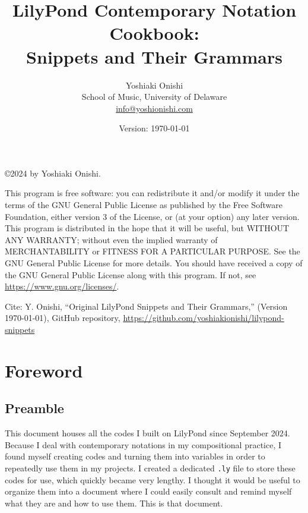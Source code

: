 \documentclass[11pt, oneside]{book}   	%
\title{LilyPond Contemporary Notation Cookbook: \\ Snippets and Their Grammars}
\author{Yoshiaki Onishi\\School of Music, University of Delaware \\ \href{mailto:info@yoshionishi.com}{info@yoshionishi.com}}
\date{Version: \today}
\begin{document}
\maketitle




\copyright 2024 by Yoshiaki Onishi. 
\hfill \break
\break

This program is free software: you can redistribute it and/or modify it under the terms of the GNU General Public License as published by the Free Software Foundation, either version 3 of the License, or (at your option) any later version.
\hfill \break
\break
This program is distributed in the hope that it will be useful, but WITHOUT ANY WARRANTY; without even the implied warranty of MERCHANTABILITY or FITNESS FOR A PARTICULAR PURPOSE. See the GNU General Public License for more details.
\hfill \break
\break
You should have received a copy of the GNU General Public License along with this program. If not, see  \href{https://www.gnu.org/licenses/}{https://www.gnu.org/licenses/}.

\hfill \break
\break
Cite: Y. Onishi, “Original LilyPond Snippets and Their Grammars,” (Version \today), GitHub repository, \href{https://github.com/yoshiakionishi/lilypond-snippets}{https://github.com/yoshiakionishi/lilypond-snippets}\\ %


\frontmatter
\tableofcontents
\label{sec:toc}
\clearpage
\vfill \break


\chapter{Foreword}
\section{Preamble}
This document houses all the codes I built on LilyPond since September 2024. Because I deal with contemporary notations in my compositional practice, I found myself creating codes and turning them into variables in order to repeatedly use them in my projects. I created a dedicated \verb|.ly| file to store these codes for use, which quickly became very lengthy. I thought it would be useful to organize them into a document where I could easily consult and remind myself what they are and how to use them. This is that document.
\end{document}
